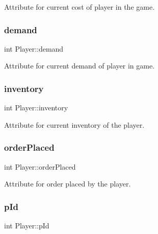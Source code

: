 Attribute for current cost of player in the game. 

\mbox{\label{class_player_aec98bfa93606a2b7cf4978c7d500917b}} 
\subsubsection{\texorpdfstring{demand}{demand}}
{\footnotesize\ttfamily int Player\+::demand\hspace{0.3cm}{\ttfamily [private]}}



Attribute for current demand of player in game. 

\mbox{\label{class_player_a68e4cf30506015d9291ffc4c1c5b1078}} 
\subsubsection{\texorpdfstring{inventory}{inventory}}
{\footnotesize\ttfamily int Player\+::inventory\hspace{0.3cm}{\ttfamily [private]}}



Attribute for current inventory of the player. 

\mbox{\label{class_player_a5ce498c11486dc2994a9ab7f3ba24260}} 
\subsubsection{\texorpdfstring{order\+Placed}{orderPlaced}}
{\footnotesize\ttfamily int Player\+::order\+Placed\hspace{0.3cm}{\ttfamily [private]}}



Attribute for order placed by the player. 

\mbox{\label{class_player_aa450b5b5cdda7cae086fb28a78d1fb8c}} 
\subsubsection{\texorpdfstring{p\+Id}{pId}}
{\footnotesize\ttfamily int Player\+::p\+Id\hspace{0.3cm}{\ttfamily [private]}}



